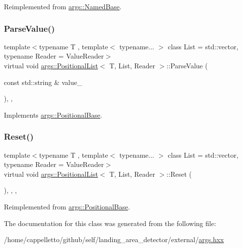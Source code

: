 Reimplemented from \hyperlink{classargs_1_1_named_base_a7e7bab5c0de59e717b87935b14376dfc}{args\+::\+Named\+Base}.

\mbox{\label{classargs_1_1_positional_list_a532d58c777cabe560dfa02674c591245}} 
\subsubsection{\texorpdfstring{Parse\+Value()}{ParseValue()}}
{\footnotesize\ttfamily template$<$typename T , template$<$ typename... $>$ class List = std\+::vector, typename Reader  = Value\+Reader$>$ \\
virtual void \hyperlink{classargs_1_1_positional_list}{args\+::\+Positional\+List}$<$ T, List, Reader $>$\+::Parse\+Value (\begin{DoxyParamCaption}\item[{const std\+::string \&}]{value\+\_\+ }\end{DoxyParamCaption})\hspace{0.3cm}{\ttfamily [inline]}, {\ttfamily [override]}, {\ttfamily [virtual]}}



Implements \hyperlink{classargs_1_1_positional_base_a10b6b91155f56bc28ca25fa87c6f0985}{args\+::\+Positional\+Base}.

\mbox{\label{classargs_1_1_positional_list_ab322681ccb2b97aa10461aba04bd8aba}} 
\subsubsection{\texorpdfstring{Reset()}{Reset()}}
{\footnotesize\ttfamily template$<$typename T , template$<$ typename... $>$ class List = std\+::vector, typename Reader  = Value\+Reader$>$ \\
virtual void \hyperlink{classargs_1_1_positional_list}{args\+::\+Positional\+List}$<$ T, List, Reader $>$\+::Reset (\begin{DoxyParamCaption}{ }\end{DoxyParamCaption})\hspace{0.3cm}{\ttfamily [inline]}, {\ttfamily [override]}, {\ttfamily [virtual]}, {\ttfamily [noexcept]}}



Reimplemented from \hyperlink{classargs_1_1_positional_base_a14edfb214858983cf5116c8d0fec72ea}{args\+::\+Positional\+Base}.



The documentation for this class was generated from the following file\+:\begin{DoxyCompactItemize}
\item 
/home/cappelletto/github/self/landing\+\_\+area\+\_\+detector/external/\hyperlink{args_8hxx}{args.\+hxx}\end{DoxyCompactItemize}
